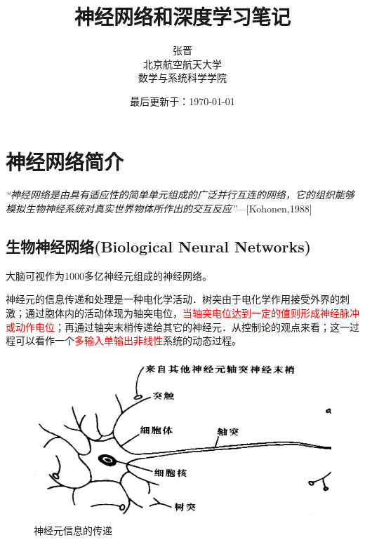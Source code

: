 
\renewcommand{\algorithmicrequire}{ \textbf{Input:}} %
\renewcommand{\algorithmicensure}{ \textbf{Output:}} %


\title{神经网络和深度学习笔记}
\author{张晋\\北京航空航天大学\\数学与系统科学学院}
\date{最后更新于：\today}


\maketitle

\tableofcontents


\newpage

\chapter{神经网络简介}
\textit{“神经网络是由具有适应性的简单单元组成的广泛并行互连的网络，它的组织能够模拟生物神经系统对真实世界物体所作出的交互反应”}---[Kohonen,1988]

\newpage
\section{生物神经网络(Biological Neural Networks)}
大脑可视作为1000多亿神经元组成的神经网络。

神经元的信息传递和处理是一种电化学活动．树突由于电化学作用接受外界的刺激；通过胞体内的活动体现为轴突电位，\textcolor{red}{当轴突电位达到一定的值则形成神经脉冲或动作电位}；再通过轴突末梢传递给其它的神经元．从控制论的观点来看；这一过程可以看作一个\textcolor{red}{多输入单输出非线性}系统的动态过程。


\begin{figure}[h]
\small
\centering
\includegraphics[width=14cm]{figure//1.png}
\caption{神经元信息的传递} \label{fig:1}
\end{figure}


